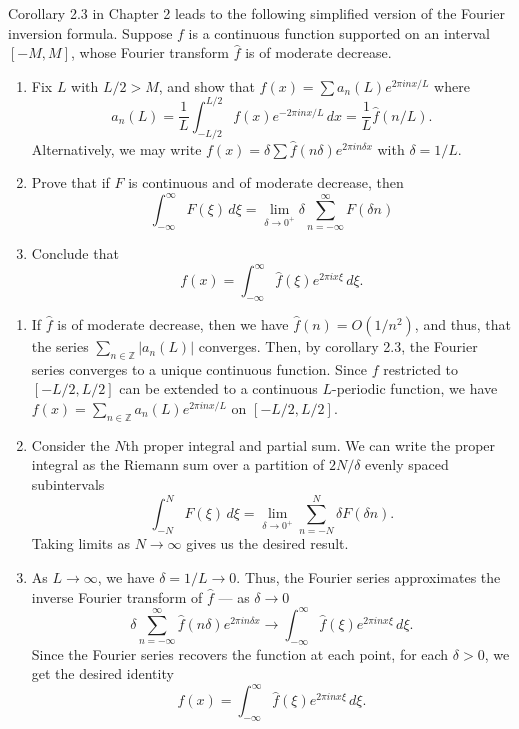 \documentclass[12 pt, letterpaper]{hmcpset}
\begin{document}
\begin{problem}[S \& S \S 5.5 \#1]
	Corollary 2.3 in Chapter 2 leads to the following simplified version of the Fourier inversion formula. Suppose $f$ is a continuous function supported on an interval $[-M, M]$, whose Fourier transform $\hat{f}$ is of moderate decrease.
	\begin{enumerate}
		\item Fix $L$ with $L / 2 > M$, and show that $f(x) = \sum a_{n}(L) e^{2 \pi i n x / L}$ where
			\[
				a_{n}(L) = \frac{1}{L} \int_{-L/2}^{L/2} f(x) e^{-2 \pi i n x / L} \, dx = \frac{1}{L} \hat{f}(n / L).
			\]
			Alternatively, we may write $f(x) = \delta \sum \hat{f}(n \delta) e^{2 \pi i n \delta x}$ with $\delta = 1 / L$.
		\item Prove that if $F$ is continuous and of moderate decrease, then
			\[
				\int_{-\infty}^{\infty} F(\xi) \, d\xi = \lim_{\delta \to 0^{+}} \delta \sum_{n = -\infty}^{\infty} F(\delta n)
			\]
		\item Conclude that
			\[
				f(x) = \int_{-\infty}^{\infty} \hat{f}(\xi) e^{2 \pi i x \xi} \, d\xi.
			\]
	\end{enumerate}
\end{problem}

\begin{solution}
	\begin{enumerate}
		\item If $\hat{f}$ is of moderate decrease, then we have $\hat{f}(n) = O(1/n^{2})$, and thus, that the series $\sum_{n \in \mathbb{Z}} \lvert a_{n}(L) \rvert$ converges. Then, by corollary 2.3, the Fourier series converges to a unique continuous function. Since $f$ restricted to $[-L/2, L/2]$ can be extended to a continuous $L$-periodic function, we have $f(x) = \sum_{n \in \mathbb{Z}} a_{n}(L) e^{2 \pi i n x/L}$ on $[-L/2, L/2]$.
		\item Consider the $N$th proper integral and partial sum. We can write the proper integral as the Riemann sum over a partition of $2N/\delta$ evenly spaced subintervals
			\[
				\int_{-N}^{N} F(\xi) \, d\xi = \lim_{\delta \to 0^{+}} \sum_{n = -N}^{N} \delta F(\delta n).
			\]
			Taking limits as $N \to \infty$ gives us the desired result.
		\item As $L \to \infty$, we have $\delta = 1/L \to 0$. Thus, the Fourier series approximates the inverse Fourier transform of $\hat{f}$ --- as $\delta \to 0$
			\[
				\delta \sum_{n = -\infty}^{\infty} \hat{f}(n \delta) e^{2 \pi i n \delta x} \to \int_{-\infty}^{\infty} \hat{f}(\xi) e^{2 \pi i n x \xi} \, d\xi.
			\]
			Since the Fourier series recovers the function at each point, for each $\delta > 0$, we get the desired identity
			\[
				f(x) = \int_{-\infty}^{\infty} \hat{f}(\xi) e^{2 \pi i n x \xi} \, d\xi.
			\]
	\end{enumerate}
\end{solution}
\end{document}
